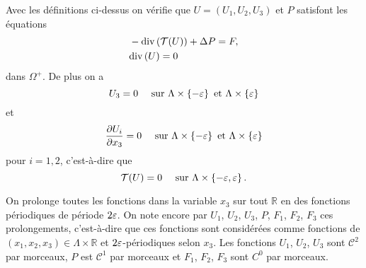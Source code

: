 Avec les définitions ci-dessus on vérifie que $U = (U_1, U_2, U_3)$ et
$P$ satisfont les équations
\begin{align}
  &-\mathrm{div}\left( \mathcal T(U) \right) + \Delta P = F,\\
  &\mathrm{div}\left( U \right) = 0
\end{align}
dans $\Omega^+$. De plus on a
\begin{equation}
U_3 = 0 \quad\text{ sur } \Lambda\times \left\{ -\varepsilon \right\} \text{ et } \Lambda\times \left\{ \varepsilon \right\}
\end{equation}
et
\begin{equation}
  \frac{\partial U_i}{\partial x_3} = 0\quad \text{ sur } \Lambda\times
  \left\{ -\varepsilon \right\} \text{ et } \Lambda\times \left\{ \varepsilon \right\}
\end{equation}
pour $i = 1,2$, c'est-à-dire que
\begin{equation}
\mathcal T(U) = 0\quad \text{ sur } \Lambda\times
\left\{ -\varepsilon, \varepsilon \right\}.
\end{equation}

On prolonge toutes les fonctions dans la variable $x_3$ sur tout
$\mathbb R$ en des fonctions périodiques de période $2\varepsilon$. On
note encore par $U_1$, $U_2$, $U_3$, $P$, $F_1$, $F_2$, $F_3$ ces
prolongements, c'est-à-dire que ces fonctions sont considérées comme
fonctions de $(x_1, x_2, x_3)\in \Lambda\times \mathbb R$ et
$2\varepsilon$-périodiques selon $x_3$. Les fonctions $U_1$, $U_2$,
$U_3$ sont $\mathcal C^2$ par morceaux, $P$ est $\mathcal C^1$ par
morceaux et $F_1$, $F_2$, $F_3$ sont $C^0$ par morceaux.

